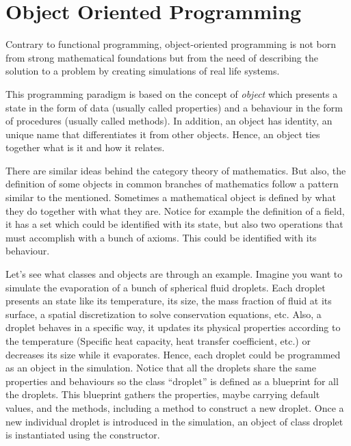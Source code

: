     \newpage 
    \section{Object Oriented Programming}

Contrary to functional programming, object-oriented programming is not born 
from strong mathematical foundations but from the need of describing the solution to a problem 
by creating simulations of real life systems.

This programming paradigm is based on the concept of \textit{object} which presents 
a state in the form of data (usually called properties) and 
a behaviour in the form of procedures (usually called methods).
In addition, an object has identity, an unique name that differentiates it from other objects. 
Hence, an object ties together what is it and how it relates.

There are similar ideas behind the category theory of mathematics.
But also, the definition of some objects in common branches of mathematics follow a pattern similar to the mentioned. 
Sometimes a mathematical object is defined by what they do together with what they are. 
Notice for example the definition of a field, it has a set which could be identified with 
its state, but also two operations that must accomplish with a bunch of axioms. 
This could be identified with its behaviour. 

Let's see what classes and objects are through an example. 
Imagine you want to simulate the evaporation of a bunch of spherical fluid droplets. 
Each droplet presents an state like its temperature, its size, the mass fraction of fluid at its surface, a spatial discretization to solve conservation equations, etc.
Also, a droplet behaves in a specific way, it updates its physical properties according to the temperature (Specific heat capacity, heat transfer coefficient, etc.) or decreases its size while it evaporates.
Hence, each droplet could be programmed as an object in the simulation. 
Notice that all the droplets share the same properties and behaviours so the class ``droplet'' 
is defined as a blueprint for all the droplets.
This blueprint gathers the properties, maybe carrying default values, and the methods, including a method to construct a new droplet. 
Once a new individual droplet is introduced in the simulation, an object of class droplet is instantiated using the constructor. 

